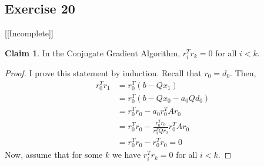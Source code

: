 \documentclass[letterpaper,12pt]{article}
\theoremstyle{definition}
\newtheorem{claim}[theorem]{Claim}
\begin{document}
\subsection*{Exercise 20}[[Incomplete]]
\begin{claim}
In the Conjugate Gradient Algorithm, $r^T_i r_k = 0$ for all $i <k $. 
\end{claim}
\begin{proof}
I prove this statement by induction. Recall that $r_0 = d_0$. Then,
\begin{align*}
	r_0^T r_1 &= r_0^T(b - Qx_1) \\
	&= r_0^T(b - Qx_0 - a_0 Q d_0) \\
	&= r_0^T r_0 - a_0 r_0^T A r_0 \\
	&= r_0^T r_0 - \frac{r_0^T r_0}{r_0^T Q r_0} r_0^T A r_0 \\ 
	&=  r_0^T r_0 -  r_0^T r_0 = 0
\end{align*}
Now, assume that for some $k$ we have $r^T_i r_k = 0$ for all $i <k $. 
\end{proof}
\end{document}
